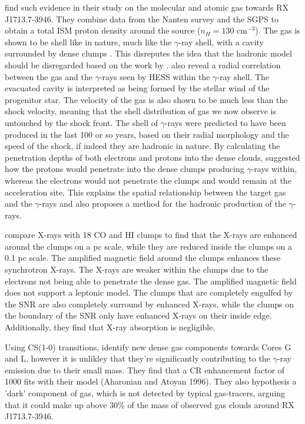 \documentclass[12pt,a4paper]{article}
\begin{document}
\cite{2012ApJ...746...82F} find such evidence in their study on the molecular and atomic gas towards RX J1713.7-3946. They combine data from the Nanten survey and the SGPS to obtain a total ISM proton density around the source ($n_H = 130$ cm$^{-3}$). The gas is shown to be shell like in nature, much like the $\gamma$-ray shell, with a cavity surrounded by dense clumps . This disreputes the idea that the hadronic model should be disregarded based on the work by \cite{2018arXiv180410579C}. \cite{2012ApJ...746...82F} also reveal a radial correlation between the gas and the $\gamma$-rays seen by HESS within the $\gamma$-ray shell. The evacuated cavity is interpreted as being formed by the stellar wind of the progenitor star. The velocity of the gas is also shown to be much less than the shock velocity, meaning that the shell distribution of gas we now observe is untouched by the shock front. The shell of $\gamma$-rays were predicted to have been produced in the last 100 or so years, based on their radial morphology and the speed of the shock, if indeed they are hadronic in nature. By calculating the penetration depths of both electrons and protons into the dense clouds, \cite{2012ApJ...746...82F} suggested how the protons would penetrate into the dense clumps producing $\gamma$-rays within, whereas the electrons would not penetrate the clumps and would remain at the acceleration site. This explains the spatial relationship between the target gas and the $\gamma$-rays and also proposes a method for the hadronic production of the $\gamma$-rays.

\cite{2013ApJ...778...59S} compare X-rays with 18 CO and HI clumps to find that the X-rays are enhanced around the clumps on a pc scale, while they are reduced inside the clumps on a 0.1 pc scale. The amplified magnetic field around the clumps enhances these synchrotron X-rays. The X-rays are weaker within the clumps due to the electrons not being able to penetrate the dense gas. The amplified magnetic field does not support a leptonic model. The clumps that are completely engulfed by the SNR are also completely surround by enhanced X-rays, while the clumps on the boundary of the SNR only have enhanced X-rays on their inside edge. Additionally, they find that X-ray absorption is negligible. 

Using CS(1-0) transitions, \cite{2013PASA...30...55M} identify new dense gas components towards Cores G and L, however it is unlikley that they're significantly contributing to the $\gamma$-ray emission due to their small mass. They find that a CR enhancement factor of 1000 fits with their model (Aharonian and Atoyan 1996). They also hypothesis a 'dark' component of gas, which is not detected by typical gas-tracers, arguing that it could make up above 30\% of the mass of observed gas clouds around RX J1713.7-3946. 
\end{document}
